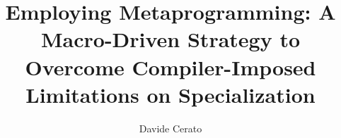 \documentclass{adapt-lab}
\begin{document}
\title{Employing Metaprogramming: A Macro-Driven Strategy to Overcome Compiler-Imposed Limitations on Specialization}
\author{Davide Cerato}
\school{}

\makefirstpage

\clearpage
\setcounter{page}{1}



\appendix
\end{document}
